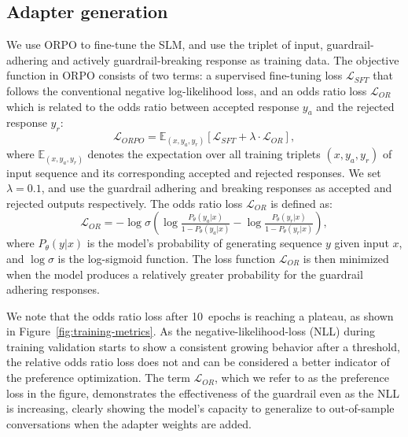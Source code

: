 \documentclass[letterpaper]{article}
\newcommand{\finetuningEpochsDefault}{10}
\newcommand{\oddsWeight}{0.1}
\begin{document}
\subsection{Adapter generation}
We use ORPO to fine-tune the SLM, and use the triplet of input, guardrail-adhering and actively guardrail-breaking response as training data. The objective function in ORPO consists of two terms: a supervised fine-tuning loss $\mathcal{L}_{SFT}$ that follows the conventional negative log-likelihood loss, and an odds ratio loss $\mathcal{L}_{OR}$ which is related to the odds ratio between accepted response $y_a$ and the rejected response $y_r$:
\begin{equation}
	\mathcal{L}_{ORPO} = \mathbb{E}_{(x,y_a,y_r)} [\mathcal{L}_{SFT} + \lambda \cdot \mathcal{L}_{OR}],
\end{equation}
where $\mathbb{E}_{(x,y_a,y_r)}$ denotes the expectation over all training triplets $(x,y_a,y_r)$ of input sequence and its corresponding accepted and rejected responses. We set $\lambda = \oddsWeight$, and use the guardrail adhering and breaking responses as accepted and rejected outputs respectively.  
The odds ratio loss $\mathcal{L}_{OR}$ is defined as:
\begin{equation}
	\mathcal{L}_{OR} = -\log \sigma \left(\log \tfrac{P_\theta(y_a|x)}{1 - P_\theta(y_a|x)} - \log \tfrac{P_\theta(y_r|x)}{1 - P_\theta(y_r|x)}\right),
\end{equation}
where $P_\theta(y|x)$ is the model's probability of generating sequence $y$ given input $x$, and $\log \sigma$ is the log-sigmoid function. The loss function $\mathcal{L}_{OR}$ is then minimized when the model produces a relatively greater probability for the guardrail adhering responses. 

We note that the odds ratio loss after \finetuningEpochsDefault~epochs is reaching a plateau, as shown in Figure~\ref{fig:training-metrics}. As the negative-likelihood-loss (NLL) during training validation starts to show a consistent growing behavior after a threshold, the relative odds ratio loss does not and can be considered a better indicator of the preference optimization.  
The term $\mathcal{L}_{OR}$, which we refer to as the preference loss in the figure, demonstrates the effectiveness of the guardrail even as the NLL is increasing, clearly showing the model's capacity to generalize to out-of-sample conversations when the adapter weights are added.
\end{document}
